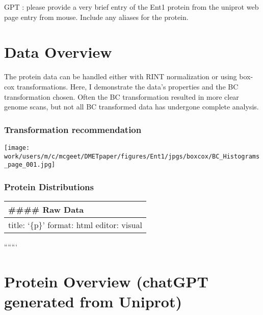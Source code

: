 \documentclass[
  letterpaper,
  DIV=11,
  numbers=noendperiod]{scrreprt}
\begin{document}
GPT : please provide a very brief entry of the Ent1 protein from the
uniprot web page entry from mouse. Include any aliases for the protein.


\chapter{Data Overview}\label{data-overview-1}

The protein data can be handled either with RINT normalization or using
box-cox transformations. Here, I demonstrate the data's properties and
the BC transformation chosen. Often the BC transformation resulted in
more clear genome scans, but not all BC transformed data has undergone
complete analysis.

\subsection{Transformation
recommendation}\label{transformation-recommendation-1}

\begin{center}
\texttt{[image: work/users/m/c/mcgeet/DMETpaper/figures/Ent1/jpgs/boxcox/BC\_Histograms\_page\_001.jpg]}
\end{center}

\subsection{Protein Distributions}\label{protein-distributions-1}

\begin{longtable}[]{@{}
  >{\raggedright\arraybackslash}p{}@{}}
\toprule\noalign{}
\begin{minipage}[b]{\linewidth}\raggedright
\#\#\#\# Raw Data
\end{minipage} \\
\midrule\noalign{}
\endhead
\bottomrule\noalign{}
\endlastfoot
title: `\{p\}' format: html editor: visual \\
\end{longtable}

```````


\chapter{Protein Overview (chatGPT generated from
Uniprot)}\label{protein-overview-chatgpt-generated-from-uniprot-2}
\end{document}
